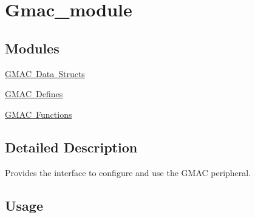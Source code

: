 \hypertarget{group__gmac__module}{}\section{Gmac\+\_\+module}
\label{group__gmac__module}
\subsection*{Modules}
\begin{DoxyCompactItemize}
\item 
\mbox{\hyperlink{group__gmac__structs}{G\+M\+A\+C Data Structs}}
\item 
\mbox{\hyperlink{group__gmac__defines}{G\+M\+A\+C Defines}}
\item 
\mbox{\hyperlink{group__gmac__functions}{G\+M\+A\+C Functions}}
\end{DoxyCompactItemize}


\subsection{Detailed Description}
Provides the interface to configure and use the G\+M\+AC peripheral.\hypertarget{group__isi__module_gmac_usage}{}\subsection{Usage}\label{group__isi__module_gmac_usage}

